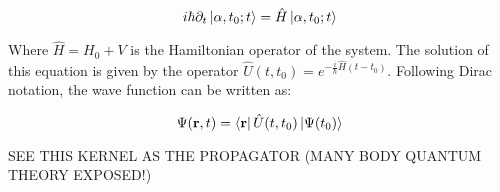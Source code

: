 \begin{equation}
    i\hbar\partial_t\ket{\alpha,t_0;t}=\hat H\ket{\alpha,t_0;t}
\end{equation}

Where $\hat H=H_0+V$ is the Hamiltonian operator of the system. The solution of this equation is given by the operator $\hat U(t,t_0) = e^{-\frac{i}{\hbar}\hat H(t-t_0)}$. Following Dirac notation, the wave function can be written as:

\begin{equation}
    \Psi(\vb r,t)=\bra{\vb r}\hat U(t,t_0)\ket{\Psi(t_0)}
\end{equation}

SEE THIS KERNEL AS THE PROPAGATOR (MANY BODY QUANTUM THEORY EXPOSED!)



